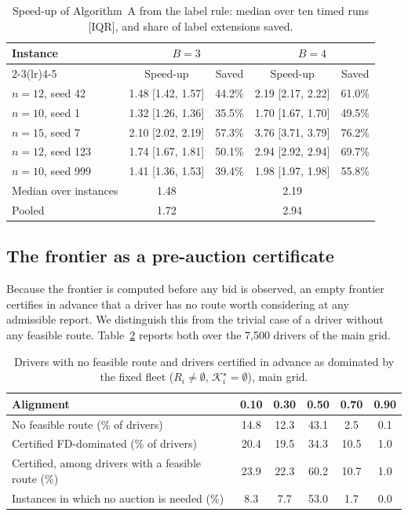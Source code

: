 \documentclass[review,12pt]{elsarticle}
\theoremstyle{definition}
\theoremstyle{remark}
\newcommand{\Kstar}{\mathcal{K}^\star}
\begin{document}
\begin{table}[t]
\centering
\caption{Speed-up of Algorithm~A from the label rule: median over ten timed runs [IQR], and share of label extensions saved.}
\label{tab:label}
\small
\begin{tabular}{lcccc}
\toprule
Instance & \multicolumn{2}{c}{$B=3$} & \multicolumn{2}{c}{$B=4$}\\
\cmidrule(lr){2-3}\cmidrule(lr){4-5}
& Speed-up & Saved & Speed-up & Saved\\
\midrule
$n=12$, seed 42  & 1.48 [1.42, 1.57] & 44.2\% & 2.19 [2.17, 2.22] & 61.0\%\\
$n=10$, seed 1   & 1.32 [1.26, 1.36] & 35.5\% & 1.70 [1.67, 1.70] & 49.5\%\\
$n=15$, seed 7   & 2.10 [2.02, 2.19] & 57.3\% & 3.76 [3.71, 3.79] & 76.2\%\\
$n=12$, seed 123 & 1.74 [1.67, 1.81] & 50.1\% & 2.94 [2.92, 2.94] & 69.7\%\\
$n=10$, seed 999 & 1.41 [1.36, 1.53] & 39.4\% & 1.98 [1.97, 1.98] & 55.8\%\\
\midrule
Median over instances & 1.48 & & 2.19 & \\
Pooled                & 1.72 & & 2.94 & \\
\bottomrule
\end{tabular}
\end{table}

\subsection{The frontier as a pre-auction certificate}
\label{sec:certificate}

Because the frontier is computed before any bid is observed, an empty
frontier certifies in advance that a driver has no route worth considering
at any admissible report. We distinguish this from the trivial case of a
driver without any feasible route. Table~\ref{tab:certificate} reports both
over the 7,500 drivers of the main grid.

\begin{table}[t]
\centering
\caption{Drivers with no feasible route and drivers certified in advance as dominated by the fixed fleet ($R_i\ne\emptyset$, $\Kstar_i=\emptyset$), main grid.}
\label{tab:certificate}
\small
\begin{tabular}{lccccc}
\toprule
Alignment & 0.10 & 0.30 & 0.50 & 0.70 & 0.90\\
\midrule
No feasible route (\% of drivers) & 14.8 & 12.3 & 43.1 & 2.5 & 0.1\\
Certified FD-dominated (\% of drivers) & 20.4 & 19.5 & 34.3 & 10.5 & 1.0\\
Certified, among drivers with a feasible route (\%) & 23.9 & 22.3 & 60.2 & 10.7 & 1.0\\
Instances in which no auction is needed (\%) & 8.3 & 7.7 & 53.0 & 1.7 & 0.0\\
\bottomrule
\end{tabular}
\end{table}
\end{document}
